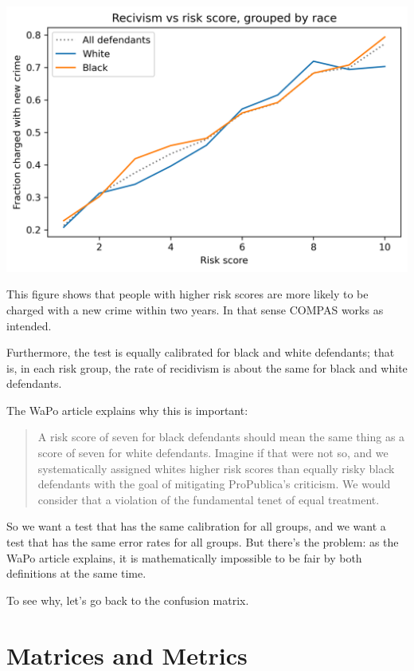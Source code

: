 \begin{center}
\includegraphics[scale=0.75]{02_calibration_files/02_calibration_21_0.png}
\end{center}

This figure shows that people with higher risk scores are more likely to
be charged with a new crime within two years. In that sense COMPAS works
as intended.

Furthermore, the test is equally calibrated for black and white
defendants; that is, in each risk group, the rate of recidivism is about
the same for black and white defendants.

The WaPo article explains why this is important:

\begin{quote}
A risk score of seven for black defendants should mean the same thing as
a score of seven for white defendants. Imagine if that were not so, and
we systematically assigned whites higher risk scores than equally risky
black defendants with the goal of mitigating ProPublica's criticism. We
would consider that a violation of the fundamental tenet of equal
treatment.
\end{quote}

So we want a test that has the same calibration for all groups, and we
want a test that has the same error rates for all groups. But there's
the problem: as the WaPo article explains, it is mathematically
impossible to be fair by both definitions at the same time.

To see why, let's go back to the confusion matrix.

\hypertarget{matrices-and-metrics}{%
\section{Matrices and Metrics}\label{matrices-and-metrics}}

